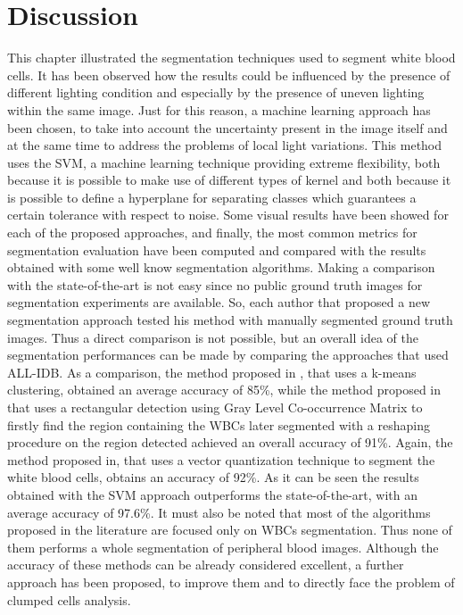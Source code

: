 {	\section{Discussion}
	\label{sec:Discussion}
	This chapter illustrated the segmentation techniques used to segment white blood cells.
	It has been observed how the results could be influenced by the presence of different lighting condition and especially by the presence of uneven lighting within the same image. Just for this reason, a machine learning approach has been chosen, to take into account the uncertainty present in the image itself and at the same time to address the problems of local light variations. This method uses the SVM, a machine learning technique providing extreme flexibility, both because it is possible to make use of different types of kernel and both because it is possible to define a hyperplane for separating classes which guarantees a certain tolerance with respect to noise. Some visual results have been showed for each of the proposed approaches, and finally, the most common metrics for segmentation evaluation have been computed and compared with the results obtained with some well know segmentation algorithms. Making a comparison with the state-of-the-art is not easy since no public ground truth images for segmentation experiments are available. So, each author that proposed a new segmentation approach tested his method with manually segmented ground truth images. Thus a direct comparison is not possible, but an overall idea of the segmentation performances can be made by comparing the approaches that used ALL-IDB. As a comparison, the method proposed in \cite{Rawat}, that uses a k-means clustering, obtained an average accuracy of 85\%, while the method proposed in \cite{Alilou} that uses a rectangular detection using Gray Level Co-occurrence Matrix to firstly find the region containing the WBCs later segmented with a reshaping procedure on the region detected achieved an overall accuracy of 91\%. Again, the method proposed in\cite{Kekre}, that uses a vector quantization technique to segment the white blood cells, obtains an accuracy of 92\%. As it can be seen the results obtained with the SVM approach outperforms the state-of-the-art, with an average accuracy of 97.6\%. It must also be noted that most of the algorithms proposed in the literature are focused only on WBCs segmentation. Thus none of them performs a whole segmentation of peripheral blood images.
	Although the accuracy of these methods can be already considered excellent, a further approach has been proposed, to improve them and to directly face the problem of clumped cells analysis.
}
